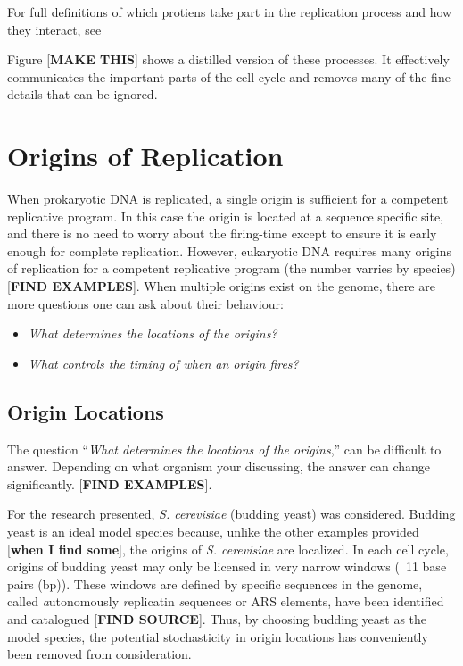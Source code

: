 		For full definitions of which protiens take part in the replication process and how they interact, see \cite{PurifiedProteins}
		
	Figure [\textbf{MAKE THIS}] shows a distilled version of these processes. It effectively communicates the important parts of the cell cycle and removes many of the fine details that can be ignored.
	
	
	\section{Origins of Replication}
	
	When prokaryotic DNA is replicated, a single origin is sufficient for a competent replicative program.
	In this case the origin is located at a sequence specific site, and there is no need to worry about the firing-time except to ensure it is early enough for complete replication.
	However, eukaryotic DNA requires many origins of replication for a competent replicative program (the number varries by species) [\textbf{FIND EXAMPLES}].
	When multiple origins exist on the genome, there are more questions one can ask about their behaviour:
	\begin{itemize}
		\item \emph{What determines the locations of the origins?}
		\item \emph{What controls the timing of when an origin fires?}
	\end{itemize}
	
		\subsection{Origin Locations}
		
		The question ``\emph{What determines the locations of the origins},'' can be difficult to answer.
		Depending on what organism your discussing, the answer can change significantly.
		[\textbf{FIND EXAMPLES}].
		
		For the research presented, \emph{S. cerevisiae} (budding yeast) was considered.
		Budding yeast is an ideal model species because, unlike the other examples provided [\textbf{when I find some}], the origins of \emph{S. cerevisiae} are localized.
		In each cell cycle, origins of budding yeast may only be licensed in very narrow windows (~11 base pairs (bp)).
		These windows are defined by specific sequences in the genome, called \emph{a}utonomously \emph{r}eplicatin \emph{s}equences or ARS elements, have been identified and catalogued [\textbf{FIND SOURCE}].
		Thus, by choosing budding yeast as the model species, the potential stochasticity in origin locations has conveniently been removed from consideration.
		
